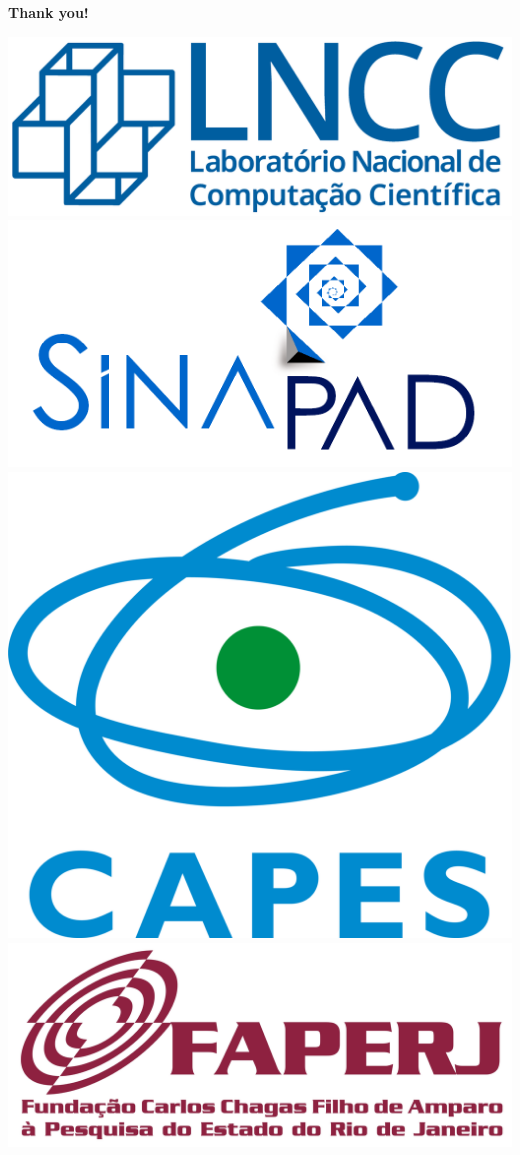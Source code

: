 \documentclass[aspectratio=169,xcolor=dvipsnames]{beamer}
\begin{document}
\begin{frame}
    \Huge{\centerline{\textbf{Thank you!}}}
    \vspace{1em}
    \begin{center}
        \includegraphics[height=1.cm]{imgs/logos/lncc-logo.png}%
        \hspace{0.5cm}%
        \includegraphics[height=1.cm]{imgs/logos/logo-sinapad.png}
        \hspace{0.5cm}%
        \includegraphics[height=1.cm]{imgs/logos/logo-capes.png}%
        \hspace{0.5cm}%
        \includegraphics[height=1.cm]{imgs/logos/logo-faperj.jpg}%

    \end{center}
\end{frame}

\end{document}
